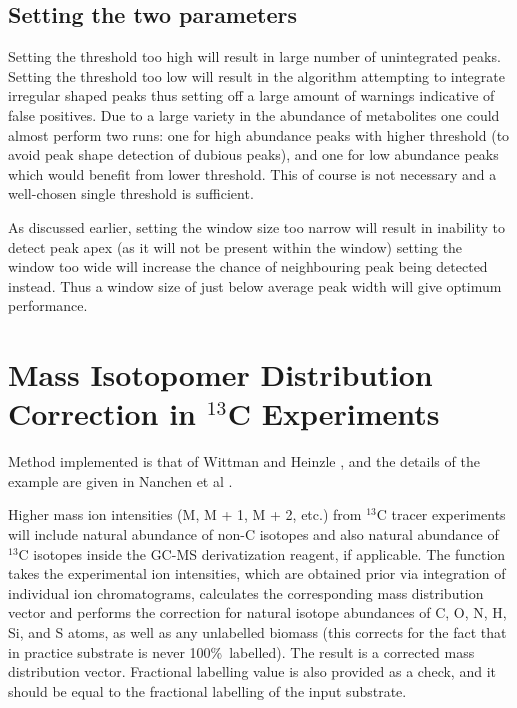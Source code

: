 \subsection
{Setting the two parameters}

Setting the threshold too high will result in large number of unintegrated 
peaks. Setting the threshold too low will result in the algorithm attempting 
to integrate irregular shaped peaks thus setting off a large amount of warnings 
indicative of false positives. Due to a large variety in the abundance of 
metabolites one could almost perform two runs: one for high abundance peaks 
with higher threshold (to avoid peak shape detection of dubious peaks), and one 
for low abundance peaks which would benefit from lower threshold. This of course 
is not necessary and a well-chosen single threshold is sufficient. 

As discussed earlier, setting the window size too narrow will result in 
inability to detect peak apex (as it will not be present within the window) 
setting the window too wide will increase the chance of neighbouring peak being 
detected instead. Thus a window size of just below average peak width will give 
optimum performance.

\section
{Mass Isotopomer Distribution Correction in $^{13}$C Experiments}


Method implemented is that of Wittman and Heinzle \cite{wittman99}, and the details
of the example are given in Nanchen et al \cite{nanchen07}. 

Higher mass ion intensities (M, M + 1, M + 2, etc.) from $^{13}$C tracer 
experiments will include natural abundance of non-C isotopes and also natural 
abundance of $^{13}$C isotopes inside the GC-MS derivatization reagent, if 
applicable. The function takes the experimental ion intensities, which are obtained 
prior via integration of individual ion chromatograms, calculates the corresponding 
mass distribution vector and performs the correction  for natural isotope 
abundances of C, O, N, H, Si, and S atoms, as well as any unlabelled biomass (this 
corrects for the fact that in practice substrate is never 100\%\ labelled). The 
result is a corrected mass distribution vector. Fractional labelling value is also
provided as a check, and it should be equal to the fractional labelling of the
input substrate.

